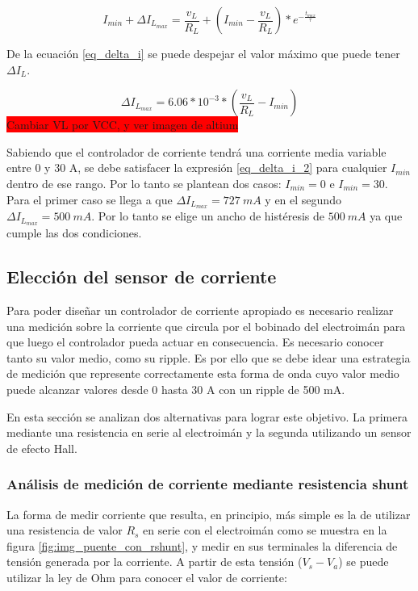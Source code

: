 \begin{equation} \label{eq_delta_i}
	I_{min}+\Delta I_{L_{max}}=\frac{v_L}{R_L}+(I_{min}-\frac{v_L}{R_L})*e^{-\frac{t_{max}}{\tau}}
\end{equation}

De la ecuación \ref{eq_delta_i} se puede despejar el valor máximo que puede tener $\Delta I_L$. 

\begin{equation} \label{eq_delta_i_2}
	\Delta I_{L_{max}}=6.06*10^{-3}*(\frac{v_L}{R_L}-I_{min})
\end{equation}
\colorbox{red}{Cambiar VL por VCC, y ver imagen de altium}

Sabiendo que el controlador de corriente tendrá una corriente media variable entre 0 y 30 A, se debe satisfacer la expresión \ref{eq_delta_i_2} para cualquier $I_{min}$ dentro de ese rango. Por lo tanto se plantean dos casos: $I_{min}=0$ e $I_{min}=30$. Para el primer caso se llega a que $\Delta I_{L_{max}}=727\:mA$ y en el segundo $\Delta I_{L_{max}}=500\:mA$. Por lo tanto se elige un ancho de histéresis de $500\:mA$ ya que cumple las dos condiciones.

\subsection{Elección del sensor de corriente}

Para poder diseñar un controlador de corriente apropiado es necesario realizar una medición sobre la corriente que circula por el bobinado del electroimán para que luego el controlador pueda actuar en consecuencia. Es necesario conocer tanto su valor medio, como su ripple. Es por ello que se debe idear una estrategia de medición que represente correctamente esta forma de onda cuyo valor medio puede alcanzar valores desde 0 hasta 30 A con un ripple de 500 mA.

En esta sección se analizan dos alternativas para lograr este objetivo. La primera mediante una resistencia en serie al electroimán y la segunda utilizando un sensor de efecto Hall.


\subsubsection{Análisis de medición de corriente mediante resistencia shunt}
La forma de medir corriente que resulta, en principio, más simple es la de utilizar una resistencia de valor $R_s$ en serie con el electroimán como se muestra en la figura \ref{fig:img_puente_con_rshunt}, y medir en sus terminales la diferencia de tensión generada por la corriente. A partir de esta tensión ($V_s-V_a$) se puede utilizar la ley de Ohm para conocer el valor de corriente:

